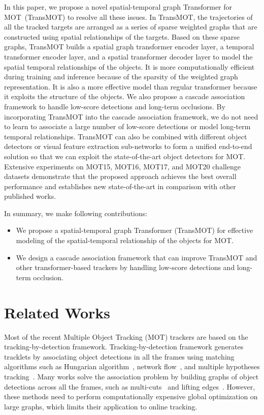 \documentclass[10pt,twocolumn,letterpaper]{article}
\newcommand{\tb}{}
\begin{document}
In this paper, we propose a novel spatial-temporal graph Transformer for MOT~(TransMOT) to resolve all these issues. In TransMOT, the trajectories of all the tracked targets are arranged as a series of sparse weighted graphs that are constructed using spatial relationships of the targets. Based on these \tb{sparse} graphs, TransMOT builds a spatial graph transformer encoder layer, a temporal transformer encoder layer, and a spatial transformer decoder layer to model the spatial temporal relationships of the objects. It is more computationally efficient during training and inference because of the sparsity of the weighted graph representation.
It is also a more effective model than regular transformer because it exploits the structure of the objects.
We also propose a cascade association framework to handle low-score detections and long-term occlusions. 
By incorporating TransMOT into the cascade association framework, we do not need to learn to associate a large number of low-score detections or model long-term temporal relationships. 
TransMOT can also be combined with different object detectors or visual feature extraction sub-networks to form a unified end-to-end solution so that we can exploit the state-of-the-art object detectors for MOT. Extensive experiments on MOT15, MOT16, MOT17, and MOT20 challenge datasets demonstrate that the proposed approach achieves the best overall performance and establishes new state-of-the-art in comparison with other published works.


In summary, we make following contributions:
\begin{itemize}
\item\vspace{-1.2mm} We propose a spatial-temporal graph Transformer (TransMOT) for effective modeling of the spatial-temporal relationship of the objects for MOT.
\item\vspace{-1.2mm} We design a cascade association framework that can improve TransMOT and other transformer-based trackers by handling low-score detections and long-term occlusion.
\end{itemize}



\section{Related Works}
Most of the recent Multiple Object Tracking (MOT) trackers are based on the tracking-by-detection framework. 
Tracking-by-detection framework generates tracklets by associating object detections in all the frames using matching algorithms such as Hungarian algorithm~\cite{bewley2016simple,fang2018recurrent,huang2008robust}, network flow~\cite{dehghan2015target,zamir2012gmcp,zhang2008global}, and multiple hypotheses tracking~\cite{chen2017enhancing,kim2015multiple}.
Many works solve the association problem by building graphs of object detections across all the frames, such as multi-cuts~\cite{keuper2018motion, tang2016multi} and lifting edges~\cite{tang2017multiple}. However, these methods need to perform computationally expensive global optimization on large graphs, which limits their application {to online} tracking. 
\end{document}
